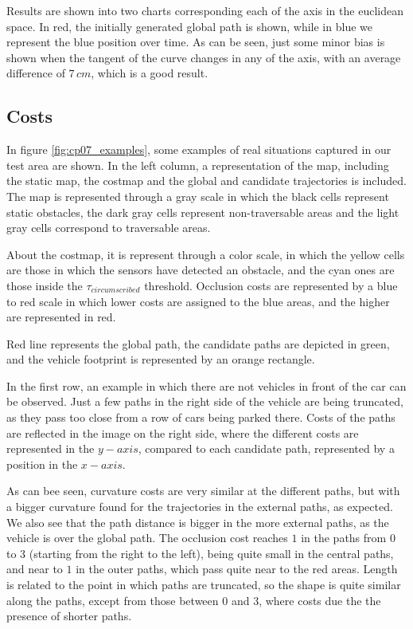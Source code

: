 Results are shown into two charts corresponding each of the axis in the euclidean space. In red, the initially generated global path is shown, while in blue we represent the blue position over time. As can be seen, just some minor bias is shown when the tangent of the curve changes in any of the axis, with an average difference of $7\,cm$, which is a good result.

\subsection{Costs}\label{ch:chapter07_02_02}

In figure \ref{fig:cp07_examples}, some examples of real situations captured in our test area are shown. In the left column, a representation of the map, including the static map, the costmap and the global and candidate trajectories is included. The map is represented through a gray scale in which the black cells represent static obstacles, the dark gray cells represent non-traversable areas and the light gray cells correspond to traversable areas.

About the costmap, it is represent through a color scale, in which the yellow cells are those in which the sensors have detected an obstacle, and the cyan ones are those inside the $\tau_{circumscribed}$ threshold. Occlusion costs are represented by a blue to red scale in which lower costs are assigned to the blue areas, and the higher are represented in red.

Red line represents the global path, the candidate paths are depicted in green, and the vehicle footprint is represented by an orange rectangle.

In the first row, an example in which there are not vehicles in front of the car can be observed. Just a few paths in the right side of the vehicle are being truncated, as they pass too close from a row of cars being parked there. Costs of the paths are reflected in the image on the right side, where the different costs are represented in the $y-axis$, compared to each candidate path, represented by a position in the $x-axis$. 

As can bee seen, curvature costs are very similar at the different paths, but with a bigger curvature found for the trajectories in the external paths, as expected. We also see that the path distance is bigger in the more external paths, as the vehicle is over the global path. The occlusion cost reaches $1$ in the paths from $0$ to $3$ (starting from the right to the left), being quite small in the central paths, and near to $1$ in the outer paths, which pass quite near to the red areas. Length is related to the point in which paths are truncated, so the shape is quite similar along the paths, except from those between $0$ and $3$, where costs due the the presence of shorter paths.

